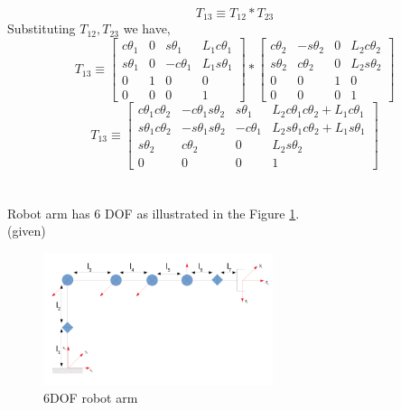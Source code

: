 \documentclass[12pt]{article}
\newcommand{\given}{{\\ \color{blue} \hspace*{\fill}(given)} \\}
\begin{document}
\[
  T_{13} \equiv T_{12} * T_{23}
\]
Substituting $T_{12}, T_{23}$ we have,
\[
  T_{13} \equiv
  \begin{bmatrix} c\theta_1 & 0 & s\theta_1 & L_1c\theta_1 \\ s\theta_1 & 0 & -c\theta_1 & L_1s\theta_1 \\ 0 & 1 & 0 & 0 \\ 0 & 0 & 0 & 1 \end{bmatrix}
  *
  \begin{bmatrix} c\theta_2 & -s\theta_2 & 0 & L_2c\theta_2 \\ s\theta_2 & c\theta_2 & 0 & L_2s\theta_2 \\ 0 & 0 & 1 & 0 \\ 0 & 0 & 0 & 1 \end{bmatrix}
\]
\[
  T_{13} \equiv
  \begin{bmatrix}
    c\theta_1c\theta_2 & -c\theta_1s\theta_2 & s\theta_1 & L_2c\theta_1c\theta_2 + L_1c\theta_1 \\
    s\theta_1c\theta_2 & -s\theta_1s\theta_2 & -c\theta_1 & L_2s\theta_1c\theta_2 + L_1s\theta_1 \\
    s\theta_2 & c\theta_2 & 0 & L_2s\theta_2 \\
    0 & 0 & 0 & 1
  \end{bmatrix}
\]

\pagebreak

\section{}
Robot arm has 6 DOF as illustrated in the Figure \ref{fig:q2.1}.
\given

\begin{figure}[h]
  \centering
  \includegraphics[width=0.6\textwidth]{q2.png}
  \caption{6DOF robot arm}
  \label{fig:q2.1}
\end{figure}
\end{document}

